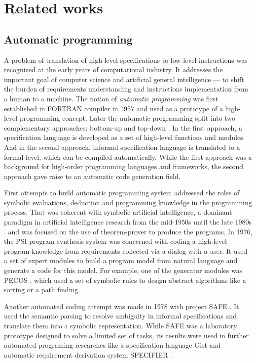 \chapter{Related works}
\label{Chapter2}

\section{Automatic programming}
A problem of translation of high-level specifications to low-level instructions was recognized at the early years of computational industry. It addresses the important goal of computer science and artificial general intelligence --- to shift the burden of requirements understanding and instructions implementation from a human to a machine. The notion of \emph{automatic programming} was first established in FORTRAN compiler in 1957 \parencite{backus1957fortran} and used as a prototype of a high-level programming concept.  Later the automatic programming split into two complementary approaches: bottom-up and top-down \parencite{Balzer1985}. In the first approach, a specification language is developed as a set of high-level functions and modules. And in the second approach, informal specification language is translated to a formal level, which can be compiled automatically. While the first approach was a background for high-order programming languages and frameworks, the second approach gave raise to an automatic code generation field. 

First attempts to build automatic programming system addressed the roles of symbolic evaluations, deduction and programming knowledge in the programming process. That was coherent with symbolic artificial intelligence, a dominant paradigm in artificial intelligence research from the mid-1950s until the late 1980s \parencite{haugeland1989artificial}. \cite{green1969application} and \cite{Lee1974} was focused on the use of theorem-prover to produce the programs. In 1976, the PSI program synthesis system \parencite{green1976design, green1977summary} was concerned with coding a high-level program knowledge from requirements collected via a dialog with a user. It used a set of expert modules to build a program model from natural language and generate a code for this model. For example, one of the generator modules was PECOS \parencite{barstow1979experiment}, which used a set of symbolic rules to design abstract algorithms like a sorting or a path finding. 

Another automated coding attempt was made in 1978 with project SAFE \parencite{balzer1978informality}. It used the semantic parsing to resolve ambiguity in informal specifications and translate them into a symbolic representation. While SAFE was a laboratory prototype designed to solve a limited set of tasks, its results were used in further automated programing researches like a specification language Gist \parencite{Balzer1985} and automatic requirement derivation system SPECIFIER \parencite{Miriyala1991}.

